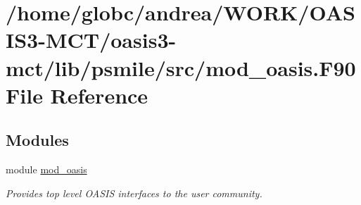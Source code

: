 \hypertarget{mod__oasis_8_f90}{}\section{/home/globc/andrea/\+W\+O\+R\+K/\+O\+A\+S\+I\+S3-\/\+M\+C\+T/oasis3-\/mct/lib/psmile/src/mod\+\_\+oasis.F90 File Reference}
\label{mod__oasis_8_f90}
\subsection*{Modules}
\begin{DoxyCompactItemize}
\item 
module \hyperlink{namespacemod__oasis}{mod\+\_\+oasis}
\begin{DoxyCompactList}\small\item\em Provides top level O\+A\+S\+IS interfaces to the user community. \end{DoxyCompactList}\end{DoxyCompactItemize}
